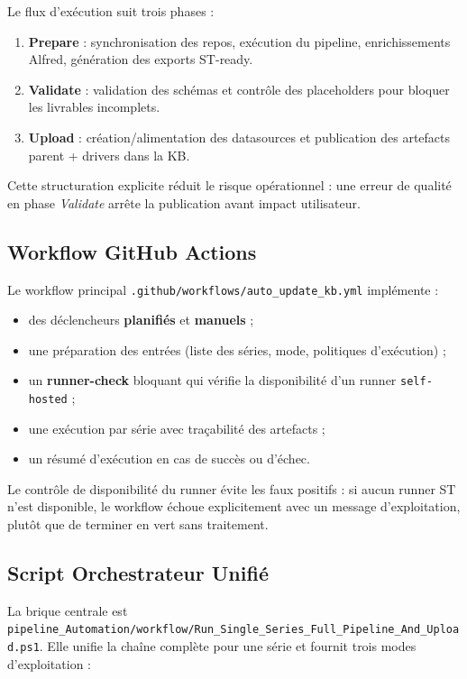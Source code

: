 Le flux d'exécution suit trois phases :
\begin{enumerate}
  \item \textbf{Prepare} : synchronisation des repos, exécution du pipeline, enrichissements Alfred, génération des exports ST-ready.
  \item \textbf{Validate} : validation des schémas et contrôle des placeholders pour bloquer les livrables incomplets.
  \item \textbf{Upload} : création/alimentation des datasources et publication des artefacts parent + drivers dans la KB.
\end{enumerate}

Cette structuration explicite réduit le risque opérationnel : une erreur de qualité en phase \textit{Validate} arrête la publication avant impact utilisateur.

\subsection{Workflow GitHub Actions}

Le workflow principal \texttt{.github/workflows/auto\_update\_kb.yml} implémente :
\begin{itemize}
  \item des déclencheurs \textbf{planifiés} et \textbf{manuels} ;
  \item une préparation des entrées (liste des séries, mode, politiques d'exécution) ;
  \item un \textbf{runner-check} bloquant qui vérifie la disponibilité d'un runner \texttt{self-hosted} ;
  \item une exécution par série avec traçabilité des artefacts ;
  \item un résumé d'exécution en cas de succès ou d'échec.
\end{itemize}

Le contrôle de disponibilité du runner évite les faux positifs : si aucun runner ST n'est disponible, le workflow échoue explicitement avec un message d'exploitation, plutôt que de terminer en vert sans traitement.

\subsection{Script Orchestrateur Unifié}

La brique centrale est \texttt{pipeline\_Automation/workflow/Run\_Single\_Series\_Full\_Pipeline\_And\_Upload.ps1}. Elle unifie la chaîne complète pour une série et fournit trois modes d'exploitation :


